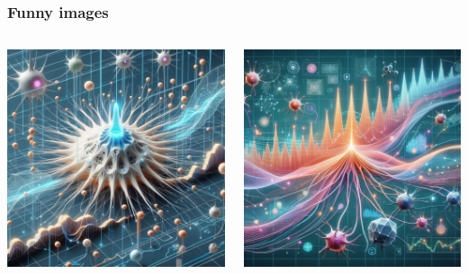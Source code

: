 \documentclass[aspectratio=169, 11pt]{beamer}
\begin{document}
\begin{frame}
  \frametitle{Funny images}

  \begin{columns}
    \begin{column}{0.5\textwidth} %
      \includegraphics[width=\textwidth]{image/3.jpeg}
    \end{column}

    \begin{column}{0.5\textwidth} %
      \includegraphics[width=\textwidth]{image/4.jpeg}
    \end{column}
  \end{columns}
\end{frame}
\end{document}
